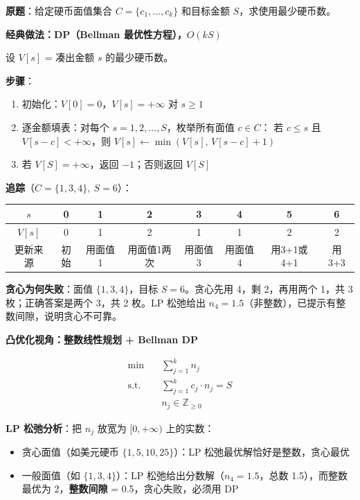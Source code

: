 \documentclass[12pt, a4paper]{ctexart}
\begin{document}
\begin{blackboard}

\textbf{原题}：给定硬币面值集合 $C = \{c_1, \ldots, c_k\}$ 和目标金额 $S$，求使用最少硬币数。

\textbf{经典做法：DP（Bellman 最优性方程），$O(kS)$}

设 $V[s]$ = 凑出金额 $s$ 的最少硬币数。

\textbf{步骤}：
\begin{enumerate}
    \item 初始化：$V[0]=0$，$V[s]=+\infty$ 对 $s \geq 1$
    \item 逐金额填表：对每个 $s = 1, 2, \ldots, S$，枚举所有面值 $c \in C$：
          若 $c \leq s$ 且 $V[s-c] < +\infty$，则 $V[s] \leftarrow \min(V[s],\, V[s-c]+1)$
    \item 若 $V[S] = +\infty$，返回 $-1$；否则返回 $V[S]$
\end{enumerate}

\textbf{追踪}（$C=\{1,3,4\},\ S=6$）：

\medskip
\begin{center}
\begin{tabular}{c|ccccccc}
$s$ & 0 & 1 & 2 & 3 & 4 & 5 & 6 \\
\hline
$V[s]$ & 0 & 1 & 2 & 1 & 1 & 2 & 2 \\
更新来源 & 初始 & 用面值1 & 用面值1两次 & 用面值3 & 用面值4 & 用3+1或4+1 & 用3+3 \\
\end{tabular}
\end{center}

\medskip
\textbf{贪心为何失败}：面值 $\{1,3,4\}$，目标 $S=6$。贪心先用 4，剩 2，再用两个 1，共 3 枚；正确答案是两个 3，共 2 枚。LP 松弛给出 $n_4 = 1.5$（非整数），已提示有整数间隙，说明贪心不可靠。

\textbf{凸优化视角：整数线性规划 + Bellman DP}

\begin{align}
\min \quad & \sum_{j=1}^{k} n_j \\
\text{s.t.} \quad & \sum_{j=1}^{k} c_j \cdot n_j = S \\
& n_j \in \mathbb{Z}_{\geq 0}
\end{align}

\textbf{LP 松弛分析}：把 $n_j$ 放宽为 $[0,+\infty)$ 上的实数：
\begin{itemize}
    \item 贪心面值（如美元硬币 $\{1,5,10,25\}$）：LP 松弛最优解恰好是整数，贪心最优
    \item 一般面值（如 $\{1,3,4\}$）：LP 松弛给出分数解（$n_4=1.5$，总数 1.5），而整数最优为 2，\textbf{整数间隙} = 0.5，贪心失败，必须用 DP
\end{itemize}


\end{blackboard}
\end{document}
